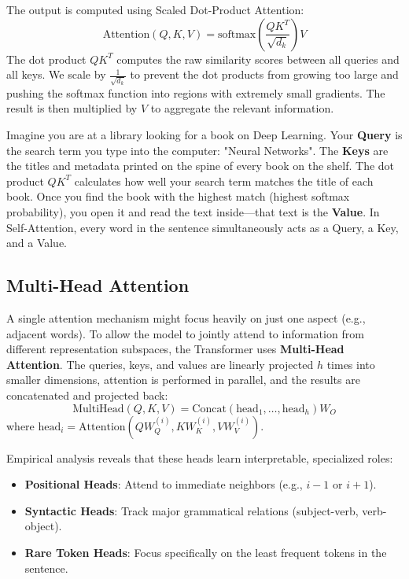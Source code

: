 The output is computed using Scaled Dot-Product Attention:
\begin{equation}
    \text{Attention}(Q, K, V) = \text{softmax}\left( \frac{Q K^T}{\sqrt{d_k}} \right) V
\end{equation}
The dot product $Q K^T$ computes the raw similarity scores between all queries and all keys. We scale by $\frac{1}{\sqrt{d_k}}$ to prevent the dot products from growing too large and pushing the softmax function into regions with extremely small gradients. The result is then multiplied by $V$ to aggregate the relevant information.

\begin{insightbox}
Imagine you are at a library looking for a book on Deep Learning. 
Your \textbf{Query} is the search term you type into the computer: "Neural Networks".
The \textbf{Keys} are the titles and metadata printed on the spine of every book on the shelf. 
The dot product $Q K^T$ calculates how well your search term matches the title of each book. 
Once you find the book with the highest match (highest softmax probability), you open it and read the text inside—that text is the \textbf{Value}. In Self-Attention, every word in the sentence simultaneously acts as a Query, a Key, and a Value.
\end{insightbox}

\subsection{Multi-Head Attention}
A single attention mechanism might focus heavily on just one aspect (e.g., adjacent words). To allow the model to jointly attend to information from different representation subspaces, the Transformer uses \textbf{Multi-Head Attention}. The queries, keys, and values are linearly projected $h$ times into smaller dimensions, attention is performed in parallel, and the results are concatenated and projected back:
\begin{equation}
    \text{MultiHead}(Q,K,V) = \text{Concat}(\text{head}_1, \dots, \text{head}_h) W_O
\end{equation}
where $\text{head}_i = \text{Attention}(Q W_Q^{(i)}, K W_K^{(i)}, V W_V^{(i)})$.

Empirical analysis reveals that these heads learn interpretable, specialized roles:
\begin{itemize}
    \item \textbf{Positional Heads}: Attend to immediate neighbors (e.g., $i-1$ or $i+1$).
    \item \textbf{Syntactic Heads}: Track major grammatical relations (subject-verb, verb-object).
    \item \textbf{Rare Token Heads}: Focus specifically on the least frequent tokens in the sentence.
\end{itemize}

